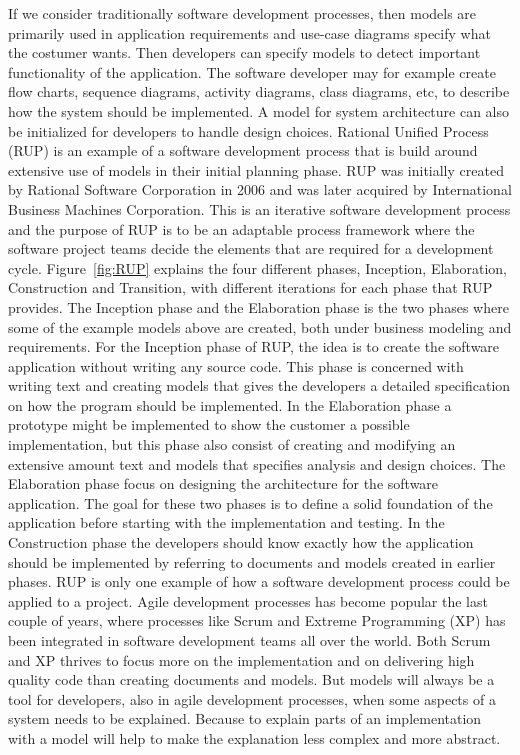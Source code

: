 If we consider traditionally software development processes, then models are
primarily used in application requirements and use-case diagrams specify what 
the costumer wants. Then developers can specify models to detect important
functionality of the application. The software developer may for example create
flow charts, sequence diagrams, activity diagrams, class diagrams, etc, to
describe how the system should be implemented. A model for system architecture
can also be initialized for developers to handle design choices. Rational
Unified Process\cite{Rational1998} (RUP) is an example of a software
development process that is build around extensive use of models in their
initial planning phase. RUP was initially created by Rational Software
Corporation\cite{IBMRational} in 2006 and was later acquired by International
Business Machines Corporation\cite{IBM}. This is an iterative software
development process and the purpose of RUP is to be an adaptable process
framework where the software project teams decide the elements that are
required for a development cycle. Figure~\ref{fig:RUP} explains the four
different phases, Inception, Elaboration, Construction and Transition, with
different iterations for each phase that RUP provides. The Inception phase and
the Elaboration phase is the two phases where some of the example models above
are created, both under business modeling and requirements. For the Inception
phase of RUP, the idea is to create the software application without writing
any source code. This phase is  concerned with writing text and creating models
that gives the developers a detailed specification on how the program should be
implemented. In the Elaboration phase a prototype might be implemented to show
the customer a possible implementation, but this phase also consist of creating
and modifying an extensive amount text and models that specifies analysis and
design choices. The Elaboration phase focus on designing the architecture for
the software application. The goal for these two phases is to define a solid
foundation of the application before starting with the implementation and
testing. In the Construction phase the developers should know exactly how the
application should be implemented by referring to documents and models created
in earlier phases. RUP is only one example of how a software development
process could be applied to a project. Agile development processes has become
popular the last couple of years, where processes like Scrum\cite{Schwaber2001}
and Extreme Programming\cite{Beck1999} (XP) has been integrated in software
development teams all over the world. Both Scrum and XP thrives to focus more
on the implementation and on delivering high quality code than creating
documents and models. But models will always be a tool for developers, also in
agile development processes, when some aspects of a system needs to be
explained. Because to explain parts of an implementation with a model will help
to make the explanation less complex and more abstract. 

